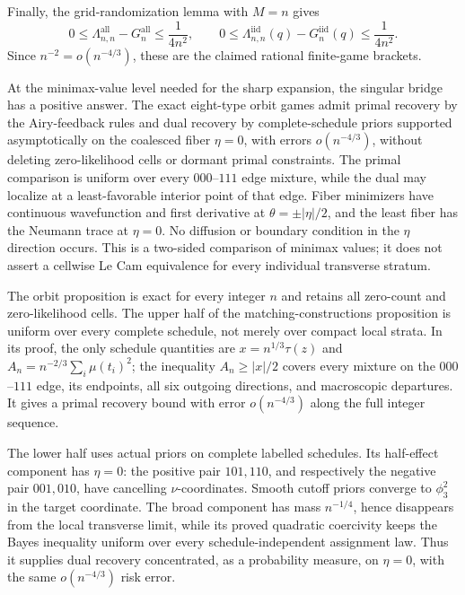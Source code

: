 Finally, the grid-randomization lemma with \(M=n\) gives
\[
0\leq\Lambda_{n,n}^{\mathrm{all}}-G_n^{\mathrm{all}}
\leq\frac1{4n^2},\qquad
0\leq\Lambda_{n,n}^{\mathrm{iid}}(q)-G_n^{\mathrm{iid}}(q)
\leq\frac1{4n^2}.
\]
Since \(n^{-2}=o(n^{-4/3})\), these are the claimed rational finite-game brackets.

At the minimax-value level needed for the sharp expansion, the singular bridge has a positive answer.  The exact eight-type orbit games admit primal recovery by the Airy-feedback rules and dual recovery by complete-schedule priors supported asymptotically on the coalesced fiber \(\eta=0\), with errors \(o(n^{-4/3})\), without deleting zero-likelihood cells or dormant primal constraints.  The primal comparison is uniform over every \(000\)--\(111\) edge mixture, while the dual may localize at a least-favorable interior point of that edge.  Fiber minimizers have continuous wavefunction and first derivative at \(\theta=\pm|\eta|/2\), and the least fiber has the Neumann trace at \(\eta=0\).  No diffusion or boundary condition in the \(\eta\) direction occurs.  This is a two-sided comparison of minimax values; it does not assert a cellwise Le Cam equivalence for every individual transverse stratum.

The orbit proposition is exact for every integer \(n\) and retains all zero-count and zero-likelihood cells.  The upper half of the matching-constructions proposition is uniform over every complete schedule, not merely over compact local strata.  In its proof, the only schedule quantities are \(x=n^{1/3}\tau(z)\) and \(A_n=n^{-2/3}\sum_i\mu(t_i)^2\); the inequality \(A_n\geq|x|/2\) covers every mixture on the \(000\)--\(111\) edge, its endpoints, all six outgoing directions, and macroscopic departures.  It gives a primal recovery bound with error \(o(n^{-4/3})\) along the full integer sequence.

The lower half uses actual priors on complete labelled schedules.  Its half-effect component has \(\eta=0\): the positive pair \(101,110\), and respectively the negative pair \(001,010\), have cancelling \(\nu\)-coordinates.  Smooth cutoff priors converge to \(\phi_3^2\) in the target coordinate.  The broad component has mass \(n^{-1/4}\), hence disappears from the local transverse limit, while its proved quadratic coercivity keeps the Bayes inequality uniform over every schedule-independent assignment law.  Thus it supplies dual recovery concentrated, as a probability measure, on \(\eta=0\), with the same \(o(n^{-4/3})\) risk error.

